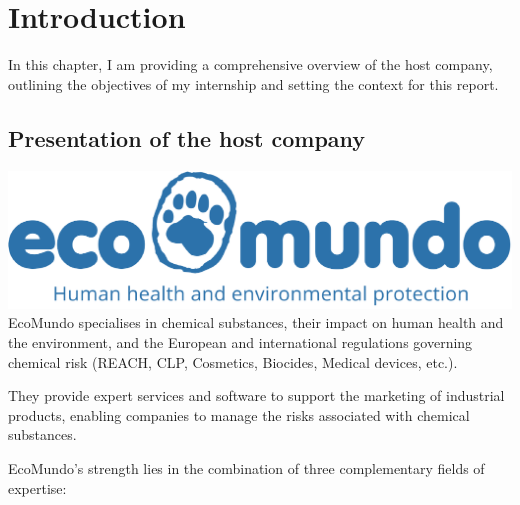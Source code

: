 \documentclass[a4paper,12pt,twoside]{report}
\begin{document}

\thispagestyle{empty}



\newpage

\chapter{Introduction}
In this chapter, I am providing a comprehensive overview of the host company, outlining the objectives of my internship and setting the context for this report.
\section{Presentation of the host company}
\includegraphics[width=\textwidth]{images/ecomundo}
EcoMundo \cite{ecomundo} specialises in chemical substances, their impact on human health and the environment, and the European and international regulations governing chemical risk (REACH, CLP, Cosmetics, Biocides, Medical devices, etc.).

They provide expert services and software to support the marketing of industrial products, enabling companies to manage the risks associated with chemical substances.

EcoMundo's strength lies in the combination of three complementary fields of expertise:
\end{document}
